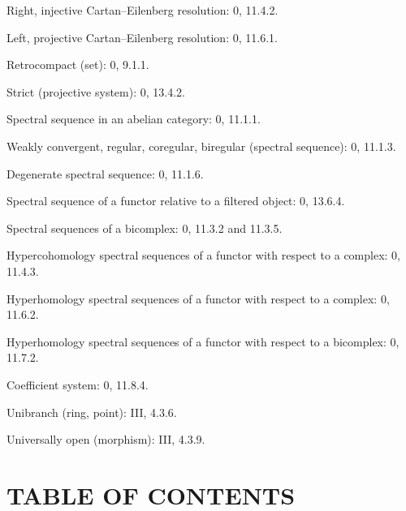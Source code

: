 \begin{flushleft}
Right, injective Cartan--Eilenberg resolution: 0, 11.4.2.

Left, projective Cartan--Eilenberg resolution: 0, 11.6.1.

Retrocompact (set): 0, 9.1.1.

Strict (projective system): 0, 13.4.2.

Spectral sequence in an abelian category: 0, 11.1.1.

Weakly convergent, regular, coregular, biregular (spectral sequence):
0, 11.1.3.

Degenerate spectral sequence: 0, 11.1.6.

Spectral sequence of a functor relative to a filtered object: 0, 13.6.4.

Spectral sequences of a bicomplex: 0, 11.3.2 and 11.3.5.

Hypercohomology spectral sequences of a functor with respect to a complex:
0, 11.4.3.

Hyperhomology spectral sequences of a functor with respect to a complex:
0, 11.6.2.

Hyperhomology spectral sequences of a functor with respect to a bicomplex:
0, 11.7.2.

Coefficient system: 0, 11.8.4.

Unibranch (ring, point): III, 4.3.6.

Universally open (morphism): III, 4.3.9.
\end{flushleft}

\clearpage
{}
\section*{TABLE OF CONTENTS}

